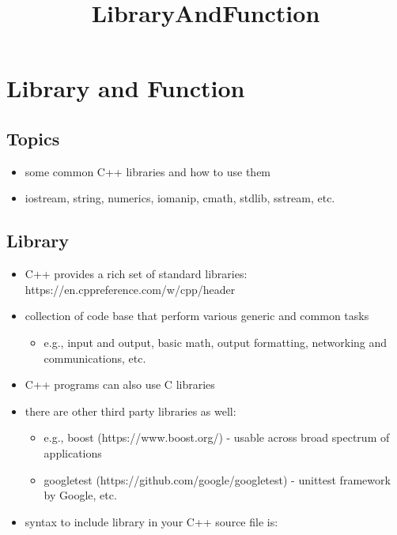 \documentclass[11pt]{article}
\title{LibraryAndFunction}
\providecommand{\tightlist}{%
      \setlength{\itemsep}{0pt}\setlength{\parskip}{0pt}}
\begin{document}
    
    \maketitle
    
    

    
    \hypertarget{library-and-function}{%
\section{Library and Function}\label{library-and-function}}

\hypertarget{topics}{%
\subsection{Topics}\label{topics}}

\begin{itemize}
\tightlist
\item
  some common C++ libraries and how to use them
\item
  iostream, string, numerics, iomanip, cmath, stdlib, sstream, etc.
\end{itemize}

    \hypertarget{library}{%
\subsection{Library}\label{library}}

\begin{itemize}
\tightlist
\item
  C++ provides a rich set of standard libraries:
  https://en.cppreference.com/w/cpp/header
\item
  collection of code base that perform various generic and common tasks

  \begin{itemize}
  \tightlist
  \item
    e.g., input and output, basic math, output formatting, networking
    and communications, etc.
  \end{itemize}
\item
  C++ programs can also use C libraries
\item
  there are other third party libraries as well:

  \begin{itemize}
  \tightlist
  \item
    e.g., boost (https://www.boost.org/) - usable across broad spectrum
    of applications
  \item
    googletest (https://github.com/google/googletest) - unittest
    framework by Google, etc.
  \end{itemize}
\item
  syntax to include library in your C++ source file is:
\end{itemize}
\end{document}
